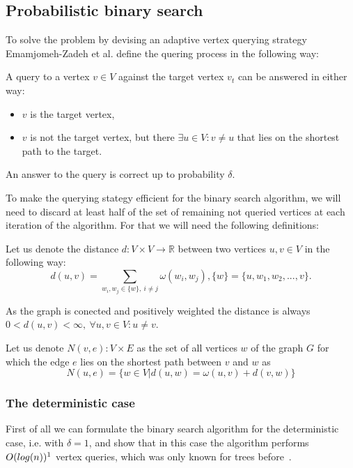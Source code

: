 \subsection*{Probabilistic binary search}
To solve the problem by devising an adaptive vertex querying strategy Emamjomeh-Zadeh et al. define the quering process in the following way:
\begin{definition}
A query to a vertex $v \in V$ against the target vertex $v_t$ can be answered in either way: 
\begin{itemize}
	\item $v$ is the target vertex,
	\item $v$ is not the target vertex, but there $\exists u \in V: v \ne u$ that lies on the shortest path to the target.
\end{itemize}


An answer to the query is correct up to probability $\delta$.
\label{pbs_def}
\end{definition}


To make the querying stategy efficient for the binary search algorithm, we will need to discard at least half of the set of remaining not queried vertices at each iteration of the algorithm. For that we will need the following definitions:
\begin{definition}
Let us denote the distance $d: V \times V \rightarrow \mathds{R}$ between two vertices $u, v \in V$ in the following way:
	\[ d(u, v) = \sum \limits_{w_i, w_j \in \{w\},~i \ne j} \omega(w_i, w_j), \{w\} = \{u, w_1, w_2, ..., v\}. \]
\end{definition}
As the graph is conected and positively weighted the distance is always $0 < d(u, v) < \infty,~\forall u, v \in V: u \ne v$.


\begin{definition}
Let us denote $N(v, e): V \times E$ as the set of all vertices $w$ of the graph $G$ for which the edge $e$ lies on the shortest path between $v$ and $w$ as
	\[N(u, e) = \{ w \in V | d(u, w) = \omega(u, v) + d(v, w) \}\]
\end{definition}


\subsubsection*{The deterministic case}
First of all we can formulate the binary search algorithm for the deterministic case, i.e. with $\delta = 1$, and show that in this case the algorithm performs $O(log(n))\footnotemark[1]$ vertex queries, which was only known for trees before~\cite{main}.


